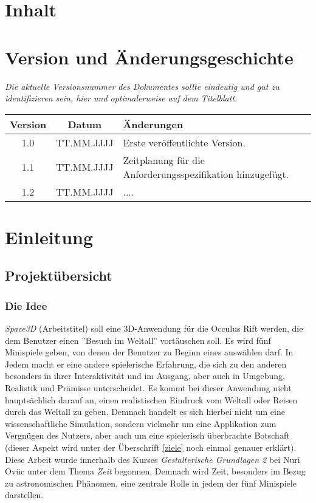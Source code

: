 \documentclass{Ausarbeitung}
\begin{document}
\maketitle


\section*{Inhalt}
\tableofcontents
\clearpage
\section*{Version und Änderungsgeschichte}

	{\em Die aktuelle Versionsnummer des Dokumentes sollte eindeutig und gut zu
	identifizieren sein, hier und optimalerweise auf dem Titelblatt.}

	\begin{tabular}{ccl}
		Version & Datum & Änderungen \\
		\hline
		1.0 & TT.MM.JJJJ & Erste veröffentlichte Version. \\
		1.1 & TT.MM.JJJJ & Zeitplanung für die Anforderungsspezifikation hinzugefügt. \\
		1.2 & TT.MM.JJJJ & .... 
	\end{tabular}
\clearpage
\section{Einleitung}
	\subsection{Projektübersicht}\label{ubersicht}
		\subsubsection{Die Idee}\label{idee}
			\textit{Space3D} (Arbeitstitel) soll eine 3D-Anwendung für die Occulus Rift werden, die dem Benutzer einen ''Besuch im Weltall'' vortäuschen soll. Es wird fünf Minispiele geben, von denen der Benutzer zu Beginn eines auswählen darf. In Jedem macht er eine andere spielerische Erfahrung, die sich zu den anderen besonders in ihrer Interaktivität und im Ausgang, aber auch in Umgebung, Realistik und Prämisse unterscheidet. Es kommt bei dieser Anwendung nicht hauptsächlich darauf an, einen realistischen Eindruck vom Weltall oder Reisen durch das Weltall zu geben. Demnach handelt es sich hierbei nicht um eine wissenschaftliche Simulation, sondern vielmehr um eine Applikation zum Vergnügen des Nutzers, aber auch um eine spielerisch überbrachte Botschaft (dieser Aspekt wird unter der Überschrift \ref{ziele} noch einmal genauer erklärt). \\
			Diese Arbeit wurde innerhalb des Kurses \textit{Gestalterische Grundlagen 2} bei Nuri Ovüc unter dem Thema \textit{Zeit} begonnen. Demnach wird Zeit, besonders im Bezug zu astronomischen Phänomen, eine zentrale Rolle in jedem der fünf Minispiele darstellen.
\end{document}
